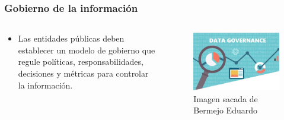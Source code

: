 \begin{frame}[allowframebreaks]

  \frametitle{Gobierno de la información}

  \begin{columns}
    \begin{column}{.5\textwidth}
      \begin{itemize}
        \item Las entidades públicas deben establecer un modelo de gobierno que regule políticas, responsabilidades, decisiones y métricas para controlar la información.
      \end{itemize}  
    \end{column}

    \begin{column}{.5\textwidth}
      \begin{figure}[ht]
        \centering
        \includegraphics[width=\textwidth]{img/GobiernoDatos.jpg}
        \caption{Imagen sacada de Bermejo Eduardo\cite{bermejo2023claves}}
      \end{figure}

    \end{column}
  \end{columns}  

  


\end{frame}

  


